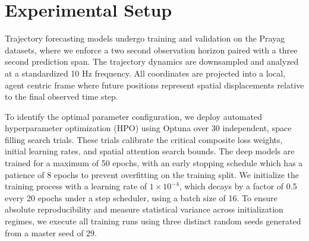 \documentclass{article}
\begin{document}
\begin{table}[htbp]
\centering
\caption{Model Characteristics Summary}
\label{tab:model_characteristics}
\end{table}

\section{Experimental Setup}
Trajectory forecasting models undergo training and validation on the Prayag datasets, where we enforce a two second observation horizon paired with a three second prediction span. The trajectory dynamics are downsampled and analyzed at a standardized 10 Hz frequency. All coordinates are projected into a local, agent centric frame where future positions represent spatial displacements relative to the final observed time step.

To identify the optimal parameter configuration, we deploy automated hyperparameter optimization (HPO) using Optuna over 30 independent, space filling search trials. These trials calibrate the critical composite loss weights, initial learning rates, and spatial attention search bounds. The deep models are trained for a maximum of 50 epochs, with an early stopping schedule which has a patience of 8 epochs to prevent overfitting on the training split. We initialize the training process with a learning rate of $1 \times 10^{-4}$, which  decays by a factor of 0.5 every 20 epochs under a step scheduler, using a batch size of 16. To ensure absolute reproducibility and measure statistical variance across initialization regimes, we execute all training runs using three distinct random seeds generated from a master seed of 29.
\end{document}
